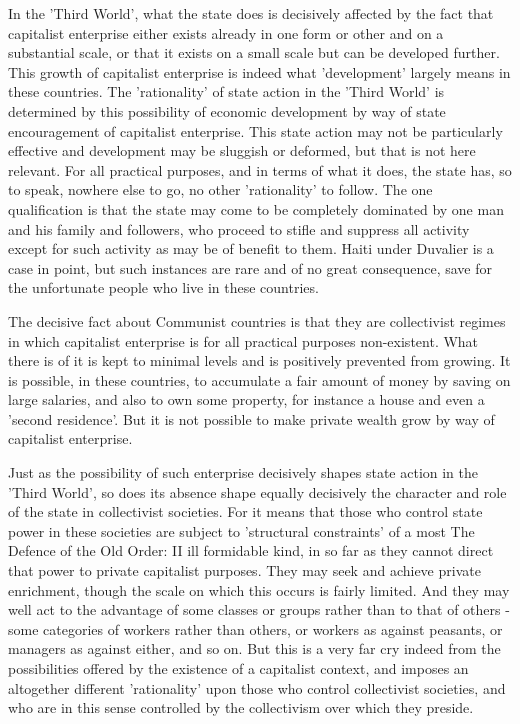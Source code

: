In the 'Third World', what the state does is decisively affected by the fact that capitalist enterprise either exists already in one form or other and on a substantial scale, or that it exists on a small scale but can be developed further. This growth of capitalist enterprise is indeed what 'development' largely means in these countries. The 'rationality' of state action in the 'Third World' is determined by this possibility of economic development by way of state encouragement of capitalist enterprise. This state action may not be particularly effective and development may be sluggish or deformed, but that is not here relevant. For all practical purposes, and in terms of what it does, the state has, so to speak, nowhere else to go, no other 'rationality' to follow. The one qualification is that the state may come to be completely dominated by one man and his family and followers, who proceed to stifle and suppress all activity except for such activity as may be of benefit to them. Haiti under Duvalier is a case in point, but such instances are rare and of no great consequence, save for the unfortunate people who live in these countries.

The decisive fact about Communist countries is that they are collectivist regimes in which capitalist enterprise is for all practical purposes non-existent. What there is of it is kept to minimal levels and is positively prevented from growing. It is possible, in these countries, to accumulate a fair amount of money by saving on large salaries, and also to own some property, for instance a house and even a 'second residence'. But it is not possible to make private wealth grow by way of capitalist enterprise.

Just as the possibility of such enterprise decisively shapes state action in the 'Third World', so does its absence shape equally decisively the character and role of the state in collectivist societies. For it means that those who control state power in these societies are subject to 'structural constraints' of a most The Defence of the Old Order: II ill formidable kind, in so far as they cannot direct that power to private capitalist purposes. They may seek and achieve private enrichment, though the scale on which this occurs is fairly limited. And they may well act to the advantage of some classes or groups rather than to that of others - some categories of workers rather than others, or workers as against peasants, or managers as against either, and so on. But this is a very far cry indeed from the possibilities offered by the existence of a capitalist context, and imposes an altogether different 'rationality' upon those who control collectivist societies, and who are in this sense controlled by the collectivism over which they preside.

